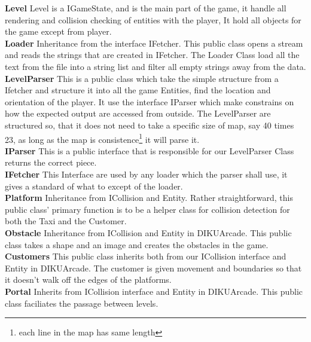 \documentclass[../master.tex]{subfiles}
\begin{document}
\textbf{Level}
Level is a IGameState, and is the main part of the game, it handle all rendering and collision checking of entities with the player, It hold all objects for the game except from player.\\

\textbf{Loader}
Inheritance from the interface IFetcher. This public class opens a stream and reads the strings that are created in IFetcher. The Loader Class load all the text from the file into a string list and filter all empty strings away from the data.\\

\textbf{LevelParser}
This is a public class which take the simple structure from a Ifetcher and structure it into all the game Entities, find the location and orientation of the player. It use the interface IParser which make constrains on how the expected output are accessed from outside. The LevelParser are structured so, that it does not need to take a specific size of map, say 40 times 23, as long as the map is consistence\footnote{each line in the map has same length} it will parse it.\\

\textbf{IParser}
This is a public interface that is responsible for our LevelParser Class returns the correct piece.\\

\textbf{IFetcher}
This Interface are used by any loader which the parser shall use, it gives a standard of what to except of the loader.\\

\textbf{Platform}
Inheritance from ICollision and Entity. Rather straightforward, this public class' primary function is to be a helper class for collision detection for both the Taxi and the Customer.\\

\textbf{Obstacle} 
Inheritance from ICollision and Entity in DIKUArcade. This public class takes a shape and an image and creates the obstacles in the game.\\

\textbf{Customers}
This public class inherits both from our ICollision interface and Entity in DIKUArcade. The customer is given movement and boundaries so that it doesn't walk off the edges of the platforms.\\

\textbf{Portal}
Inherits from ICollision interface and Entity in DIKUArcade. This public class faciliates the passage between levels.
\end{document}
